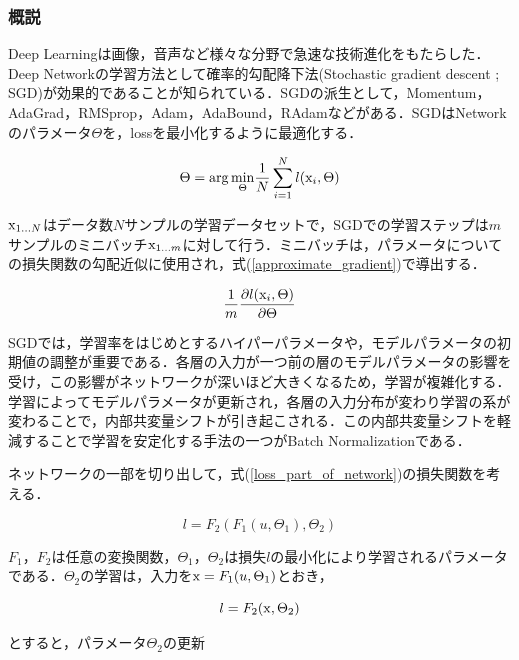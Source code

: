 \documentclass[11pt,a4paper]{jsarticle}
\begin{document}
\subsubsection{概説}
Deep Learningは画像，音声など様々な分野で急速な技術進化をもたらした．Deep Networkの学習方法として確率的勾配降下法(Stochastic gradient descent ; SGD)が効果的であることが知られている\cite{sgd_overview}．SGDの派生として，Momentum，AdaGrad，RMSprop，Adam，AdaBound，RAdamなどがある．SGDはNetworkのパラメータ$\Theta$を，lossを最小化するように最適化する．

\begin{equation}
	\Theta = {\rm arg}\,\underset{\Theta}{\rm min}\frac{1}{N}\sum_{i=1}^{N}l({\rm x}_i, \Theta)
\end{equation}

${\rm x}_{1...N}$はデータ数$N$サンプルの学習データセットで，SGDでの学習ステップは$m$サンプルのミニバッチ${\rm x}_{1...m}$に対して行う．ミニバッチは，パラメータについての損失関数の勾配近似に使用され，式(\ref{approximate_gradient})で導出する．

\begin{equation}
\label{approximate_gradient}
	\frac{1}{m}\frac{\partial l({\rm x}_i, \Theta)}{\partial \Theta}
\end{equation}

SGDでは，学習率をはじめとするハイパーパラメータや，モデルパラメータの初期値の調整が重要である．各層の入力が一つ前の層のモデルパラメータの影響を受け，この影響がネットワークが深いほど大きくなるため，学習が複雑化する．学習によってモデルパラメータが更新され，各層の入力分布が変わり学習の系が変わることで，内部共変量シフトが引き起こされる．この内部共変量シフトを軽減することで学習を安定化する手法の一つがBatch Normalizationである．

ネットワークの一部を切り出して，式(\ref{loss_part_of_network})の損失関数を考える．

\begin{equation}
\label{loss_part_of_network}
	l = F_2(F_1(u, \Theta_1), \Theta_2)
\end{equation}

$F_1，F_2$は任意の変換関数，$\Theta_1，\Theta_2$は損失$l$の最小化により学習されるパラメータである．$\Theta_2$の学習は，入力を${\rm x} = F_1(u, \Theta_1)$とおき，

\begin{equation}
	l = F_2({\rm x}, \Theta_2)
\end{equation}

とすると，パラメータ$\Theta_2$の更新
\end{document}
